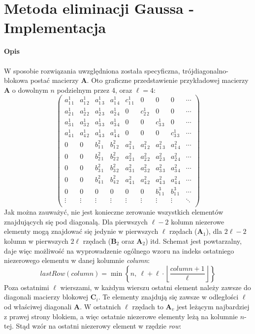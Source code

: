 \documentclass{article}
\newcommand{\mA}{\bm{A}}
\newcommand{\mB}{\bm{B}}
\newcommand{\mC}{\bm{C}}
\begin{document}
\section*{Metoda eliminacji Gaussa - Implementacja}
\noindent \textbf{Opis}\\\\
\indent W sposobie rozwiązania uwzględniona została specyficzna, trójdiagonalno-blokowa postać macierzy $\mA$. Oto graficzne przedstawienie przykładowej macierzy $\mA$ o dowolnym $n$ podzielnym przez 4, oraz $\ell=4$:
$$
\left(\begin{array}{ccccccccc}
a_{1\,1}^1 & a_{1\,2}^1 & a_{1\,3}^1 & a_{1\,4}^1 & c_{1\,1}^1 & 0 & 0 & 0 & \cdots \\
a_{2\,1}^1 & a_{2\,2}^1 & a_{2\,3}^1 & a_{2\,4}^1 & 0 & c_{2\,2}^1 & 0 & 0 & \cdots \\
a_{3\,1}^1 & a_{3\,2}^1 & a_{3\,3}^1 & a_{3\,4}^1 & 0 & 0 & c_{3\,3}^1 & 0 & \cdots \\
a_{4\,1}^1 & a_{4\,2}^1 & a_{4\,3}^1 & a_{4\,4}^1 & 0 & 0 & 0 & c_{3\,3}^1 & \cdots \\
0 & 0 & b_{1\,1}^2 & b_{1\,2}^2 & a_{1\,1}^2 & a_{1\,2}^2 & a_{1\,3}^2 & a_{1\,4}^2 & \cdots \\
0 & 0 & b_{2\,1}^2 & b_{2\,2}^2 & a_{2\,1}^2 & a_{2\,2}^2 & a_{2\,3}^2 & a_{2\,4}^2 & \cdots \\
0 & 0 & b_{3\,1}^2 & b_{3\,2}^2 & a_{3\,1}^2 & a_{3\,2}^2 & a_{3\,3}^2 & a_{3\,4}^2 & \cdots \\
0 & 0 & b_{4\,1}^2 & b_{4\,2}^2 & a_{4\,1}^2 & a_{4\,2}^2 & a_{4\,3}^2 & a_{4\,4}^2 & \cdots \\
0 & 0 & 0 & 0 & 0 & 0 & b_{1\,1}^3 & b_{1\,1}^3 & \cdots \\
\vdots & \vdots & \vdots & \vdots & \vdots & \vdots & \vdots & \vdots & \ddots \\
\end{array}\right)
$$
\newpage
Jak można zauważyć, nie jest konieczne zerowanie wszystkich elementów znajdujących się pod diagonalą. Dla pierwszych $\ell-2$ kolumn niezerowe elementy mogą znajdować się jedynie w pierwszych $\ell$ rzędach ($\mA_1$), dla $2\ell-2$ kolumn w pierwszych $2\ell$ rzędach ($\mB_2$ oraz $\mA_2$) itd. Schemat jest powtarzalny, daje więc możliwość na wyprowadzenie ogólnego wzoru na indeks ostatniego niezerowego elementu w danej kolumnie \textit{column}:
$$
lastRow(column) = \min\left\lbrace n,~\ell + \ell \cdot \left \lfloor\frac{column + 1}{\ell}\right \rfloor\right\rbrace
$$
\indent Poza ostatnimi $\ell$ wierszami, w każdym wierszu ostatni element należy zawsze do diagonali macierzy blokowej $\mC_i$. Te elementy znajdują się zawsze w odległości $\ell$ od właściwej diagonali $\mA$. W ostatnich $\ell$ rzędach to $\mA_v$ jest leżącym najbardziej z prawej strony blokiem, a więc ostatnie niezerowe elementy leżą na kolumnie $n$-tej. Stąd wzór na ostatni niezerowy element w rzędzie \textit{row}:
\end{document}

